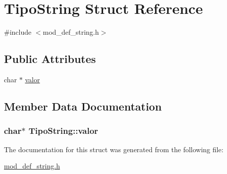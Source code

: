 \hypertarget{structTipoString}{\section{Tipo\+String Struct Reference}
\label{structTipoString}
}


{\ttfamily \#include $<$mod\+\_\+def\+\_\+string.\+h$>$}

\subsection*{Public Attributes}
\begin{DoxyCompactItemize}
\item 
char $\ast$ \hyperlink{structTipoString_ae6127901dd0062b5277e98ac9fa97382}{valor}
\end{DoxyCompactItemize}


\subsection{Member Data Documentation}
\hypertarget{structTipoString_ae6127901dd0062b5277e98ac9fa97382}{
\subsubsection[{valor}]{\setlength{\rightskip}{0pt plus 5cm}char$\ast$ Tipo\+String\+::valor}}\label{structTipoString_ae6127901dd0062b5277e98ac9fa97382}


The documentation for this struct was generated from the following file\+:\begin{DoxyCompactItemize}
\item 
\hyperlink{mod__def__string_8h}{mod\+\_\+def\+\_\+string.\+h}\end{DoxyCompactItemize}
